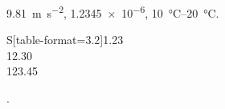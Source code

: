 \documentclass{article}
\begin{document}
\qty{9.81}{\metre\per\second\squared}, \num{1.2345e-6}, \qtyrange{10}{20}{\celsius}.
\begin{tabular}{S[table-format=3.2]}1.23\\12.30\\123.45\end{tabular}
\quad{}\quad{}.
\end{document}

